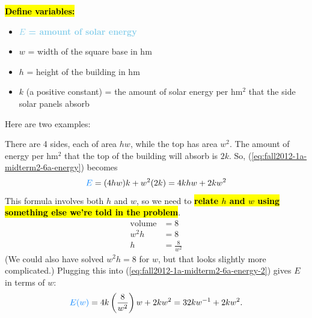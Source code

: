 \documentclass{article}
\newcommand{\highlight}[1]{\boldmath\hl{\textbf{#1}}\unboldmath}
\newcommand{\goal}[1]{\textbf{\textcolor{skyblue}{#1}}}
\theoremstyle{theorem}
\begin{document}
\begin{enumerate}
\begin{solution}
    \highlight{Define variables:}
    \begin{itemize}[nosep]
    \item \goal{$E$ = amount of solar energy}
    \item $w$ = width of the square base in hm
    \item $h$ = height of the building in hm
    \item $k$ (a positive constant) = the amount of solar energy per hm$^2$ that the side solar panels absorb
    \end{itemize}
    Here are two examples:
    \begin{center}
      \hspace{0.25in}
    \end{center}
    There are 4 sides, each of area $hw$, while the top has area $w^2$. The amount of energy per hm$^2$ that the top of the building will absorb is $2k$. So, (\ref{eq:fall2012-1a-midterm2-6a-energy}) becomes
    \begin{equation} \label{eq:fall2012-1a-midterm2-6a-energy-2}
      \goal{$E$} = (4hw) k + w^2 (2k) = 4 k hw + 2k w^2
    \end{equation}
    This formula involves both $h$ and $w$, so we need to \highlight{relate $h$ and $w$ using something else we're told in the problem}.
    \begin{align*}
      \text{volume} &= 8 \\
      w^2 h &= 8 \\
      h &= \frac{8}{w^2}
    \end{align*}
    (We could also have solved $w^2 h = 8$ for $w$, but that looks slightly more complicated.) Plugging this into (\ref{eq:fall2012-1a-midterm2-6a-energy-2}) gives $E$ in terms of $w$:
    \[ \goal{$E(w)$} = 4 k \left( \frac{8}{w^2} \right) w + 2 k w^2 = 32 k w^{-1} + 2k w^2.\]


\end{solution}
\end{enumerate}
\end{document}
